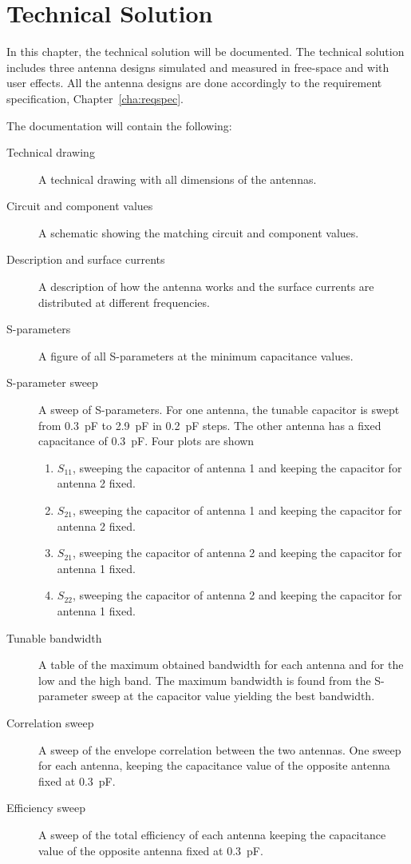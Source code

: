 \chapter{Technical Solution}
In this chapter, the technical solution will be documented. The technical solution includes three antenna designs simulated and measured in free-space and with user effects. All the antenna designs are done accordingly to the requirement specification, Chapter~\ref{cha:reqspec}. 

The documentation will contain the following:
\begin{description}
\item[Technical drawing] A technical drawing with all dimensions of the antennas. 
\item[Circuit and component values] A schematic showing the matching circuit and component values.
\item[Description and surface currents] A description of how the antenna works and the surface currents are distributed at different frequencies.
\item[S-parameters] A figure of all S-parameters at the minimum capacitance values.
\item[S-parameter sweep] A sweep of S-parameters. For one antenna, the tunable capacitor is swept from \SI{0.3}{pF} to \SI{2.9}{pF} in \SI{0.2}{pF} steps. The other antenna has a fixed capacitance of \SI{0.3}{pF}. Four plots are shown
    \begin{enumerate}
    \item $S_{11}$, sweeping the capacitor of antenna 1 and keeping the capacitor for antenna 2 fixed.
    \item $S_{21}$, sweeping the capacitor of antenna 1 and keeping the capacitor for antenna 2 fixed.
    \item $S_{21}$, sweeping the capacitor of antenna 2 and keeping the capacitor for antenna 1 fixed.
    \item $S_{22}$, sweeping the capacitor of antenna 2 and keeping the capacitor for antenna 1 fixed.
    \end{enumerate}
\item[Tunable bandwidth] A table of the maximum obtained bandwidth for each antenna and for the low and the high band. The maximum bandwidth is found from the S-parameter sweep at the capacitor value yielding the best bandwidth.
\item[Correlation sweep] A sweep of the envelope correlation between the two antennas. One sweep for each antenna, keeping the capacitance value of the opposite antenna fixed at \SI{0.3}{pF}.
\item[Efficiency sweep] A sweep of the total efficiency of each antenna keeping the capacitance value of the opposite antenna fixed at \SI{0.3}{pF}.
\end{description}
